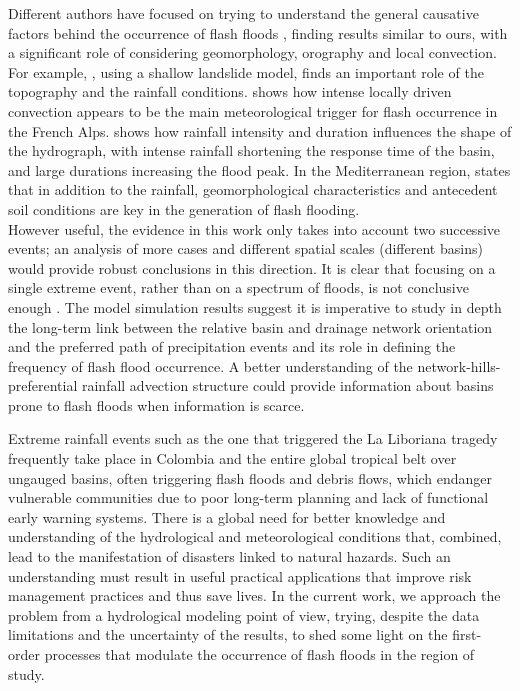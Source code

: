\documentclass[hess, manuscript]{copernicus}
\begin{document}
Different authors have focused on trying to understand the general causative factors behind the occurrence of flash floods \citep{Marchi2010}, finding results similar to ours, with a significant role of considering geomorphology, orography and local convection. For example, \citet{Lehmann2012}, using a shallow landslide model, finds an important role of the topography and the rainfall conditions. \citet{Turkington2014} shows how intense locally driven convection appears to be the main meteorological trigger for flash occurrence in the French Alps.\citet{Camarasa2016} shows how rainfall intensity and duration influences the shape of the hydrograph, with intense rainfall shortening the response time of the basin, and large durations increasing the flood peak. In the Mediterranean region, \citet{Boudou2016} states that in addition to the rainfall, geomorphological characteristics and antecedent soil conditions are key in the generation of flash flooding.\\

However useful, the evidence in this work only takes into account two successive events; an analysis of more cases and different spatial scales (different basins) would provide robust conclusions in this direction. It is clear that focusing on a single extreme event, rather than on a spectrum of floods, is not conclusive enough \cite{Merz2003}.  The model simulation results suggest it is imperative to study in depth the long-term link between the relative basin and drainage network orientation and the preferred path of precipitation events and its role in defining the frequency of flash flood occurrence. A better understanding of the network-hills-preferential rainfall advection structure could provide information about basins prone to flash floods when information is scarce.\\



\conclusions[Conclusions]
\label{sec:conclusions}

Extreme rainfall events such as the one that triggered the La Liboriana tragedy frequently take place in Colombia and the entire global tropical belt over ungauged basins, often triggering flash floods and debris flows, which endanger vulnerable communities due to poor long-term planning and lack of functional early warning systems. There is a global need for better knowledge and understanding of the hydrological and meteorological conditions that, combined, lead to the manifestation of disasters linked to natural hazards. Such an understanding must result in useful practical applications that improve risk management practices and thus save lives. In the current work, we approach the problem from a hydrological modeling point of view, trying, despite the data limitations and the uncertainty of the results, to shed some light on the first-order processes that modulate the occurrence of flash floods in the region of study.  \\  
\end{document}
